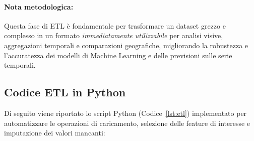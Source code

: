 \paragraph{Nota metodologica:}
Questa fase di ETL è fondamentale per trasformare un dataset grezzo e complesso in un formato \textit{immediatamente utilizzabile} per analisi visive, aggregazioni temporali e comparazioni geografiche, migliorando la robustezza e l'accuratezza dei modelli di Machine Learning e delle previsioni sulle serie temporali.

\subsection{Codice ETL in Python}
Di seguito viene riportato lo script Python (Codice~\ref{lst:etl}) implementato per automatizzare le operazioni di caricamento, selezione delle feature di interesse e imputazione dei valori mancanti:

